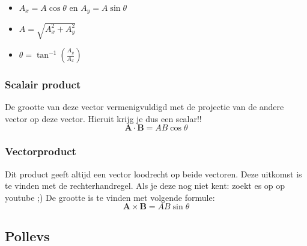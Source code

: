 \documentclass[12pt,a4paper]{article}
\begin{document}
    \begin{itemize}
        \item \(A_x = A\cos\theta\) en \(A_y = A\sin\theta\)
        \item \(A = \sqrt{A_x^2 + A_y^2}\)
        \item \(\theta = \tan^{-1}(\frac{A_y}{A_x})\)
    \end{itemize}

    \subsubsection{Scalair product}
    De grootte van deze vector vermenigvuldigd met de projectie van de andere vector op deze vector. Hieruit krijg je dus een scalar!!
    \[\textbf{A} \cdot \textbf{B} = AB \cos\theta\]

    \subsubsection{Vectorproduct}
    Dit product geeft altijd een vector loodrecht op beide vectoren. Deze uitkomst is te vinden met de rechterhandregel. Als je deze nog niet kent: zoekt es op op youtube ;)
    De grootte is te vinden met volgende formule:
    \[\textbf{A} \times \textbf{B} = AB\sin\theta\]

    \subsection{Pollevs}
\end{document}
